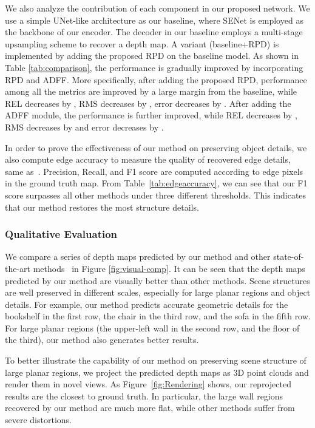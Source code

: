 \documentclass{article}
\begin{document}
We also analyze the contribution of each component in our proposed network. 
We use a simple UNet-like architecture as our baseline, where SENet \cite{hu2018squeeze} is employed as the backbone of our encoder. 
The decoder in our baseline employs a multi-stage upsampling scheme to recover a depth map. 
A variant (baseline+RPD) is implemented by adding the proposed RPD on the baseline model.
As shown in Table \ref{tab:comparison}, the performance is gradually improved by incorporating RPD and ADFF. More specifically, after adding the proposed RPD, performance among all the metrics are improved by a large margin from the baseline, while REL decreases by , RMS decreases by ,  error decreases by . 
After adding the ADFF module, the performance is further improved, while REL decreases by , RMS decreases by  and  error decreases by .  

In order to prove the effectiveness of our method on preserving object details, we also compute edge accuracy to measure the quality of recovered edge details, same as~\cite{hu2019revisiting}. Precision, Recall, and F1 score are computed according to edge pixels in the ground truth map. From Table~\ref{tab:edgeaccuracy}, we can see that our F1 score surpasses all other methods under three different thresholds. This indicates that our method restores the most structure details.
\subsubsection{Qualitative Evaluation}
We compare a series of depth maps predicted by our method and other state-of-the-art methods~\cite{laina2016deeper,xu2017multi,fu2018deep,hu2019revisiting} in Figure \ref{fig:visual-comp}.
It can be seen that the depth maps predicted by our method are visually better than other methods.
Scene structures are well preserved in different scales, especially for large planar regions and object details.
For example, our method predicts accurate geometric details for the bookshelf in the first row, the chair in the third row, and the sofa in the fifth row. 
For large planar regions (the upper-left wall in the second row, and the floor of the third), our method also generates better results. 

To better illustrate the capability of our method on preserving scene structure of large planar regions, we project the predicted depth maps as 3D point clouds and render them in novel views.
As Figure~\ref{fig:Rendering} shows, our reprojected results are the closest to ground truth. In particular, the large wall regions recovered by our method are much more flat, while other methods suffer from severe distortions. 
\end{document}
